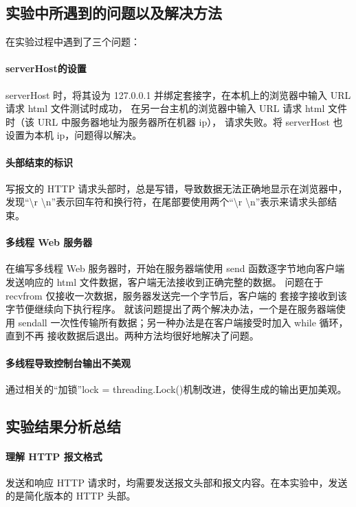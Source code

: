 \documentclass[a4paper,12pt]{report}
\begin{document}
\begin{spacing}{1.5}
\subsection{实验中所遇到的问题以及解决方法}
在实验过程中遇到了三个问题： 

\paragraph*{serverHost的设置}serverHost 时，将其设为 127.0.0.1 并绑定套接字，在本机上的浏览器中输入 URL 请求 html 文件测试时成功，
在另一台主机的浏览器中输入 URL 请求 html 文件时（该 URL 中服务器地址为服务器所在机器 ip），
请求失败。将 serverHost 也设置为本机 ip，问题得以解决。 

\paragraph*{头部结束的标识}写报文的 HTTP 请求头部时，总是写错，导致数据无法正确地显示在浏览器中， 
发现“\textbackslash r \textbackslash n”表示回车符和换行符，在尾部要使用两个“\textbackslash r \textbackslash n”表示来请求头部结束。

\paragraph*{多线程 Web 服务器}在编写多线程 Web 服务器时，开始在服务器端使用 send 函数逐字节地向客户端发送响应的 html 文件数据，客户端无法接收到正确完整的数据。
问题在于recvfrom 仅接收一次数据，服务器发送完一个字节后，客户端的 套接字接收到该字节便继续向下执行程序。
就该问题提出了两个解决办法，一个是在服务器端使 用 sendall 一次性传输所有数据；另一种办法是在客户端接受时加入 while 循环，直到不再 接收数据后退出。两种方法均很好地解决了问题。

\paragraph*{多线程导致控制台输出不美观}通过相关的“加锁”lock = threading.Lock()机制改进，使得生成的输出更加美观。


\subsection{实验结果分析总结}
\paragraph{理解 HTTP 报文格式} 发送和响应 HTTP 请求时，均需要发送报文头部和报文内容。在本实验中，发送的是简化版本的 HTTP 头部。  


\end{spacing}
\end{document}
